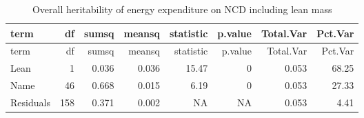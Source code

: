 \documentclass[]{article}
\newenvironment{Shaded}{\begin{snugshade}}{\end{snugshade}}
\newcommand{\DataTypeTok}[1]{\textcolor[rgb]{0.13,0.29,0.53}{#1}}
\newcommand{\DecValTok}[1]{\textcolor[rgb]{0.00,0.00,0.81}{#1}}
\newcommand{\KeywordTok}[1]{\textcolor[rgb]{0.13,0.29,0.53}{\textbf{#1}}}
\newcommand{\NormalTok}[1]{#1}
\newcommand{\OperatorTok}[1]{\textcolor[rgb]{0.81,0.36,0.00}{\textbf{#1}}}
\newcommand{\StringTok}[1]{\textcolor[rgb]{0.31,0.60,0.02}{#1}}
\begin{document}
\begin{longtable}[]{@{}lrrrrrrr@{}}
\caption{Overall heritability of energy expenditure on NCD including
lean mass}\tabularnewline
\toprule
term & df & sumsq & meansq & statistic & p.value & Total.Var &
Pct.Var\tabularnewline
\midrule
\endfirsthead
\toprule
term & df & sumsq & meansq & statistic & p.value & Total.Var &
Pct.Var\tabularnewline
\midrule
\endhead
Lean & 1 & 0.036 & 0.036 & 15.47 & 0 & 0.053 & 68.25\tabularnewline
Name & 46 & 0.668 & 0.015 & 6.19 & 0 & 0.053 & 27.33\tabularnewline
Residuals & 158 & 0.371 & 0.002 & NA & NA & 0.053 & 4.41\tabularnewline
\bottomrule
\end{longtable}

\begin{Shaded}
\end{Shaded}
\end{document}
